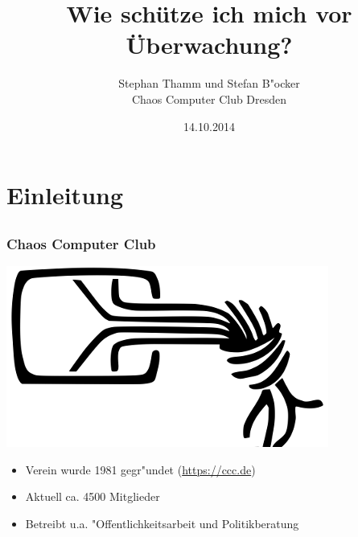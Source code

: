 \documentclass[12pt]{beamer}
\title{Wie schütze ich mich vor Überwachung?}
\author{\small Stephan Thamm und Stefan B"ocker\\\large Chaos Computer Club Dresden}
\date{14.10.2014}
\begin{document}
\maketitle

\section{Einleitung}
\subsection{}

\begin{frame}
    \frametitle{Chaos Computer Club}
    \begin{center}
	\includegraphics[height=0.2\textheight]{img/chaosknoten.png}
    \end{center}	
    \begin{itemize}
      \item<1-> Verein wurde 1981 gegr"undet (\url{https://ccc.de})          
      \item<2-> Aktuell ca. 4500 Mitglieder
      \item<3-> Betreibt u.a. "Offentlichkeitsarbeit und Politikberatung      
    \end{itemize}
\end{frame}
\end{document}

